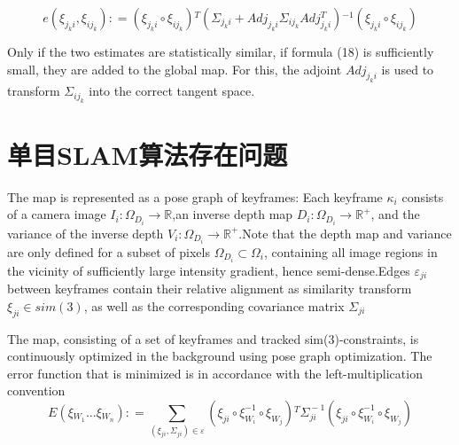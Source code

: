 \begin{equation}
e\!(\!{\xi _{{j_k}i}},{\xi _{i{j_k}}})\!: \!= \!{\!(\!{\xi _{{j_k}i}} \!\circ \!{\xi _{i{j_k}}})\!^T}{\!(\!{\Sigma _{{j_k}i}}\! +\! Ad{j_{{j_k}i}}{\Sigma _{i{j_k}}}Adj_{{j_k}i}^T\!)\!^{ - 1}}\!(\!{\xi _{{j_k}i}}\! \circ\! {\xi _{i{j_k}}}\!)
\end{equation}

Only if the two estimates are statistically similar, if formula (18) is sufficiently small, they are added to the global map. For this, the adjoint $Ad{j_{{j_k}i}}$ is used to transform ${\Sigma _{i{j_k}}}$ into the correct tangent space.


\section{单目SLAM算法存在问题}
The map is represented as a pose graph of keyframes: Each keyframe $\kappa_{i}$ consists of a camera image $I_{i}\!:\!\Omega_{D_{i}}\!\rightarrow \!{\mathbb{R}}$,an inverse depth map $D_{i}\!:\!\Omega_{D_{i}}\!\rightarrow \!{\mathbb{R}}^{+}$, and the variance of the inverse depth $ V_{i}\!:\!\Omega_{D_{i}}\!\rightarrow \!{\mathbb{R}}^{+}$.Note that the depth map and variance are only defined for a subset of pixels $ \Omega_{D_{i}}\!\subset\!\Omega_{i} $, containing all image regions in the vicinity of sufficiently large intensity gradient, hence semi-dense.Edges $ \varepsilon_{ji}$ between keyframes contain their relative alignment as similarity transform $ \xi_{ji}\in sim(3) $, as well as the corresponding covariance matrix $\Sigma_{ji} $

The map, consisting of a set of keyframes and tracked sim(3)-constraints, is continuously optimized in the background using pose graph optimization. The
error function that is minimized is in accordance with the left-multiplication convention
\begin{equation}
E(\xi\!_{W\!_{1}}\!...\!\xi\!_{W\!_{n}})\!:\!= \sum\limits_{(\!\xi\!_{ji},\Sigma\!_{ji}\!)\!\in\!\varepsilon}\!(\!\xi_{ji}\!\circ\!\xi_{\!W_{i}\!}^{-1}\! \!\circ\!\xi_{\!W\!_{j}}\!)\!^{T}\!\Sigma_{\!j\!i}^{\!-1\!}\!(\!\xi_{ji}\!\circ\!\xi_{\!W_{i}\!}^{-1}\! \!\circ\!\xi_{\!W\!_{j}}\!)
\end{equation}


